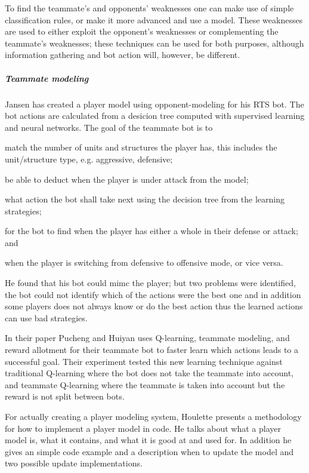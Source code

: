 To find the teammate’s and opponents’ weaknesses one can make use of simple classification rules, or make it more advanced and use a model. These weaknesses are used to either exploit the opponent's weaknesses or complementing the teammate's weaknesses; these techniques can be used for both purposes, although information gathering and bot action will, however, be different.

\subparagraph{Teammate modeling}
Jansen has created a player model using opponent-modeling for his RTS bot\cite{jansen07}. The bot actions are calculated from a  desicion tree computed with supervised learning and neural networks. The goal of the teammate bot is to
\begin{inparaenum}[1\upshape)]
	\item match the number of units and structures the player has, this includes the unit/structure type, e.g. aggressive, defensive;
	\item be able to deduct when the player is under attack from the model;
	\item what action the bot shall take next using the decision tree from the learning strategies;
	\item for the bot to find when the player has either a whole in their defense or attack; and
	\item when the player is switching from defensive to offensive mode, or vice versa.
\end{inparaenum}
He found that his bot could mimc the player; but two problems were identified, the bot could not identify which of the actions were the best one and in addition some players does not always know or do the best action thus the learned actions can use bad strategies.

In their paper\cite{pucheng11} Pucheng and Huiyan uses Q-learning, teammate modeling, and reward allotment for their teammate bot to faster learn which actions leads to a successful goal. Their experiment tested this new learning technique against traditional Q-learning where the bot does not take the teammate into account, and teammate Q-learning where the teammate is taken into account but the reward is not split between bots.

For actually creating a player modeling system, Houlette presents a methodology for how to implement a player model in code\cite{houlette03}. He talks about what a player model is, what it contains, and what it is good at and used for. In addition he gives an simple code example and a description when to update the model and two possible update implementations.

